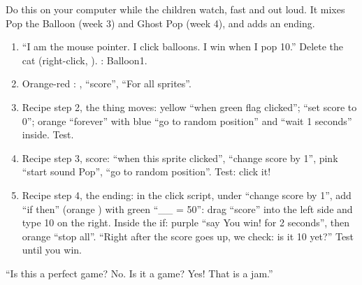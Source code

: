 \begin{workedexample}
Do this on your computer while the children watch, fast and out loud. It mixes Pop the Balloon (week 3) and Ghost Pop (week 4), and adds an ending.
\begin{enumerate}[leftmargin=1.4em,itemsep=1pt]
  \item \enquote{I am the mouse pointer. I click balloons. I win when I pop 10.} Delete the cat (right-click, ). : Balloon1.
  \item Orange-red : , \enquote{score}, \enquote{For all sprites}.
  \item Recipe step 2, the thing moves: yellow  \enquote{when green flag clicked}; \enquote{set score to 0}; orange  \enquote{forever} with blue  \enquote{go to random position} and \enquote{wait 1 seconds} inside. Test.
  \item Recipe step 3, score: \enquote{when this sprite clicked}, \enquote{change score by 1}, pink  \enquote{start sound Pop}, \enquote{go to random position}. Test: click it!
  \item Recipe step 4, the ending: in the click script, under \enquote{change score by 1}, add \enquote{if then} (orange ) with green  \enquote{\_\_ = 50}: drag \enquote{score} into the left side and type 10 on the right. Inside the if: purple  \enquote{say You win! for 2 seconds}, then orange  \enquote{stop all}. \enquote{Right after the score goes up, we check: is it 10 yet?} Test until you win.
\end{enumerate}
\begin{center}
\begin{scratch}[scale=0.85]
\end{scratch}
\quad
\begin{scratch}[scale=0.85]
\end{scratch}
\end{center}
\enquote{Is this a perfect game? No. Is it a game? Yes! That is a jam.}
\end{workedexample}

